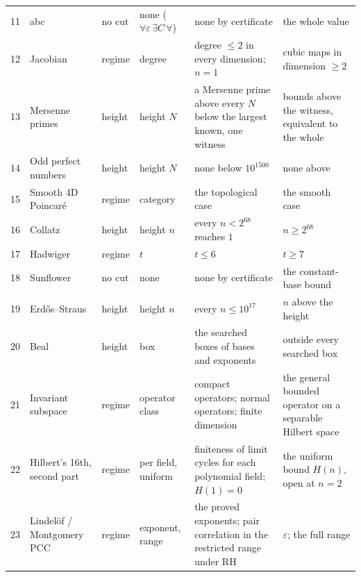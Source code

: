 \documentclass[10pt,twocolumn]{article}
\begin{document}
\begin{table}[!t]
\begin{tabularx}{\textwidth}{@{}P{0.02\textwidth} P{0.13\textwidth} P{0.05\textwidth} P{0.10\textwidth} L L@{}}
11 & abc & no cut & none ($\forall\varepsilon\,\exists C\,\forall$) & none by certificate & the whole value \\
12 & Jacobian & regime & degree & degree $\le 2$ in every dimension; $n = 1$ & cubic maps in dimension $\ge 2$ \\
13 & Mersenne primes & height & height $N$ & a Mersenne prime above every $N$ below the largest known, one witness & bounds above the witness, equivalent to the whole \\
14 & Odd perfect numbers & height & height $N$ & none below $10^{1500}$ & none above \\
15 & Smooth 4D Poincaré & regime & category & the topological case & the smooth case \\
16 & Collatz & height & height $n$ & every $n < 2^{68}$ reaches $1$ & $n \ge 2^{68}$ \\
17 & Hadwiger & regime & $t$ & $t \le 6$ & $t \ge 7$ \\
18 & Sunflower & no cut & none & none by certificate & the constant-base bound \\
19 & Erdős--Straus & height & height $n$ & every $n \le 10^{17}$ & $n$ above the height \\
20 & Beal & height & box & the searched boxes of bases and exponents & outside every searched box \\
21 & Invariant subspace & regime & operator class & compact operators; normal operators; finite dimension & the general bounded operator on a separable Hilbert space \\
22 & Hilbert's 16th, second part & regime & per field, uniform & finiteness of limit cycles for each polynomial field; $H(1) = 0$ & the uniform bound $H(n)$, open at $n = 2$ \\
23 & Lindelöf / Montgomery PCC & regime & exponent, range & the proved exponents; pair correlation in the restricted range under RH & $\varepsilon$; the full range \\
\bottomrule
\end{tabularx}
\end{table}
\end{document}
